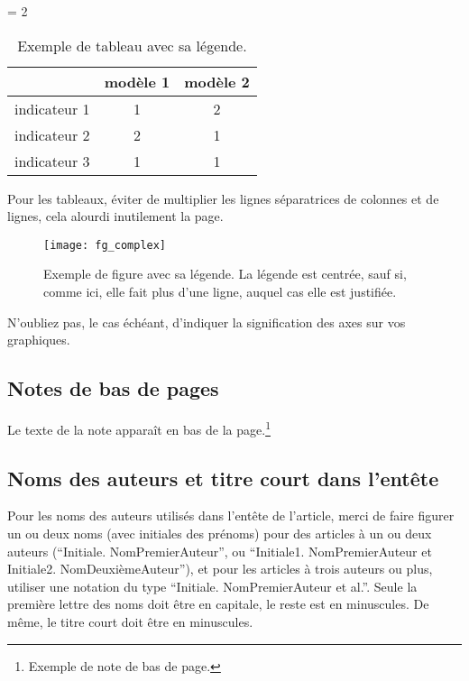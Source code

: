 \documentclass[a4paper,pagenum,french,showlayout]{rnti}
\begin{document}
\begin{table}[ht]
 \begin{center}
   \tabcolsep = 2\tabcolsep
   \begin{tabular}{lcc}
   \hline\hline
                & modèle 1 & modèle 2 \\
   \hline
   indicateur 1 & 1        & 2        \\
   indicateur 2 & 2        & 1        \\
   indicateur 3 & 1        & 1        \\
   \hline
   \end{tabular}
\caption{Exemple de tableau avec sa légende.} \label{tab_exemple}
 \end{center}
\end{table}

Pour les tableaux, éviter de multiplier les lignes séparatrices de
colonnes et de lignes, cela alourdi inutilement la page.


\begin{figure}[t]
\begin{center}
 \texttt{[image: fg\_complex]}
 \caption{Exemple de figure avec sa légende. La légende est centrée,
sauf si, comme ici, elle fait plus d'une ligne, auquel cas elle est
justifiée.} \label{fig_exemple}
\end{center}
\end{figure}

N'oubliez pas, le cas échéant, d'indiquer la signification des axes
sur vos graphiques.


\subsection{Notes de bas de pages}

Le texte de la note apparaît en bas de la page.\footnote{Exemple de
note de bas de page.}

\subsection{Noms des auteurs et titre court dans l'entête}

Pour les noms des auteurs utilisés dans l'entête de l'article, merci
de faire figurer un ou deux noms (avec initiales des prénoms) pour
des articles à un ou deux auteurs (``Initiale. NomPremierAuteur'',
ou ``Initiale1. NomPremierAuteur et Initiale2. NomDeuxièmeAuteur''),
et pour les articles à trois auteurs ou plus, utiliser une notation
du type ``Initiale. NomPremierAuteur et al.''. Seule la première
lettre des noms doit être en capitale, le reste est en minuscules.
De même, le titre court doit être en minuscules.
\end{document}
